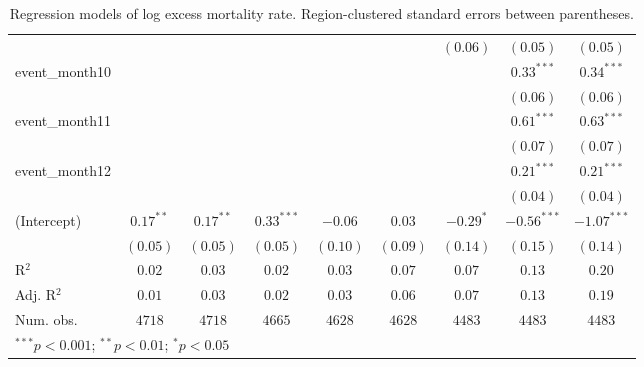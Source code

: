 \begin{table}
\begin{center}
\begin{tabular}{l c c c c c c c c}
                     &              &              &              &               &               & $(0.06)$      & $(0.05)$      & $(0.05)$      \\
event\_month10       &              &              &              &               &               &               & $0.33^{***}$  & $0.34^{***}$  \\
                     &              &              &              &               &               &               & $(0.06)$      & $(0.06)$      \\
event\_month11       &              &              &              &               &               &               & $0.61^{***}$  & $0.63^{***}$  \\
                     &              &              &              &               &               &               & $(0.07)$      & $(0.07)$      \\
event\_month12       &              &              &              &               &               &               & $0.21^{***}$  & $0.21^{***}$  \\
                     &              &              &              &               &               &               & $(0.04)$      & $(0.04)$      \\
(Intercept)          & $0.17^{**}$  & $0.17^{**}$  & $0.33^{***}$ & $-0.06$       & $0.03$        & $-0.29^{*}$   & $-0.56^{***}$ & $-1.07^{***}$ \\
                     & $(0.05)$     & $(0.05)$     & $(0.05)$     & $(0.10)$      & $(0.09)$      & $(0.14)$      & $(0.15)$      & $(0.14)$      \\
\hline
R$^2$                & $0.02$       & $0.03$       & $0.02$       & $0.03$        & $0.07$        & $0.07$        & $0.13$        & $0.20$        \\
Adj. R$^2$           & $0.01$       & $0.03$       & $0.02$       & $0.03$        & $0.06$        & $0.07$        & $0.13$        & $0.19$        \\
Num. obs.            & $4718$       & $4718$       & $4665$       & $4628$        & $4628$        & $4483$        & $4483$        & $4483$        \\
\hline
\multicolumn{9}{l}{\scriptsize{$^{***}p<0.001$; $^{**}p<0.01$; $^{*}p<0.05$}}
\end{tabular}
\caption{Regression models of log excess mortality rate. Region-clustered standard errors between parentheses.}
\label{tab:basemodels}
\end{center}
\end{table}
